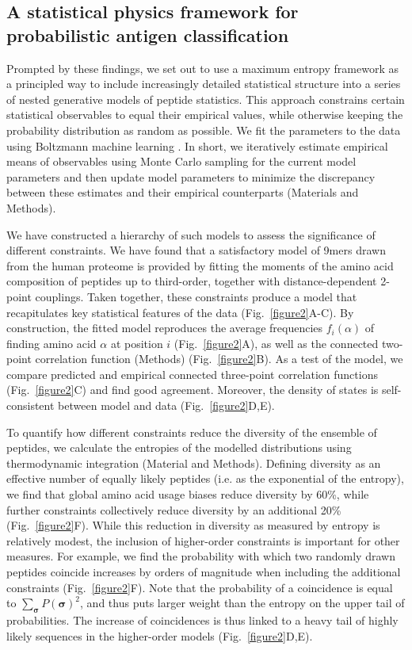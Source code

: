 \documentclass[superscriptaddress,twocolumn,pre]{revtex4}
\newcommand{\B}{\boldsymbol}
\newcommand{\<}{\langle}
\renewcommand{\>}{\rangle}
\begin{document}
\subsection{A statistical physics framework for probabilistic antigen classification} 

Prompted by these findings, we set out to use a maximum entropy framework as a principled way to include increasingly detailed statistical structure into a series of nested generative models of peptide statistics. This approach constrains certain statistical observables to equal their empirical values, while otherwise keeping the probability distribution as random as possible. We fit the parameters to the data using Boltzmann machine learning \cite{Ackley1985}. In short, we iteratively estimate empirical means of observables using Monte Carlo sampling for the current model parameters and then update model parameters to minimize the discrepancy between these estimates and their empirical counterparts (Materials and Methods).

We have constructed a hierarchy of such models to assess the significance of different constraints. We have found that a satisfactory model of 9mers drawn from the human proteome is provided by fitting the moments of the amino acid composition of peptides up to third-order, together with distance-dependent 2-point couplings. Taken together, these constraints produce a model that recapitulates key statistical features of the data (Fig.~\ref{figure2}A-C). By construction, the fitted model reproduces the average frequencies $f_i(\alpha)$ of finding amino acid $\alpha$ at position $i$ (Fig.~\ref{figure2}A), as well as the connected two-point correlation function (Methods) (Fig.~\ref{figure2}B). As a test of the model, we compare predicted and empirical connected three-point correlation functions (Fig.~\ref{figure2}C) and find good agreement. Moreover, the density of states is self-consistent between model and data (Fig.~\ref{figure2}D,E).

To quantify how different constraints reduce the diversity of the ensemble of peptides, we calculate the entropies  of the modelled distributions using thermodynamic integration (Material and Methods). Defining diversity as an effective number of equally likely peptides (i.e. as the exponential of the entropy), we find that global amino acid usage biases reduce diversity by 60\%, while further constraints collectively reduce diversity by an additional 20\% (Fig.~\ref{figure2}F). While this reduction in diversity as measured by entropy is relatively modest, the inclusion of higher-order constraints is important for other measures. For example, we find the probability with which two randomly drawn peptides coincide increases by orders of magnitude when including the additional constraints (Fig.~\ref{figure2}F). Note that the probability of a coincidence is equal to $\sum_{\B \sigma} P(\B \sigma)^2$, and thus puts larger weight than the entropy on the upper tail of probabilities. The increase of coincidences is thus linked to a heavy tail of highly likely sequences in the higher-order models (Fig.~\ref{figure2}D,E).
\end{document}
